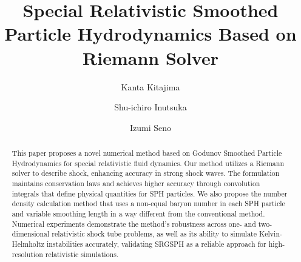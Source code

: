 \documentclass[]{aastex631}
\begin{document}
\title{Special Relativistic Smoothed Particle Hydrodynamics Based on Riemann Solver}

\author[0000-0003-0738-0707]{Kanta Kitajima}

\author[0000-0003-4366-6518]{Shu-ichiro Inutsuka}

\author[0009-0003-9296-3161]{Izumi Seno}

\begin{abstract}
This paper proposes a novel numerical method based on Godunov Smoothed Particle Hydrodynamics for special relativistic fluid dynamics. Our method utilizes a Riemann solver to describe shock, enhancing accuracy in strong shock waves.
The formulation maintains conservation laws and achieves higher accuracy through convolution integrals that define physical quantities for SPH particles.
We also propose the number density calculation method that uses a non-equal baryon number in each SPH particle and variable smoothing length in a way different from the conventional method. Numerical experiments demonstrate the method’s robustness across one- and two-dimensional relativistic shock tube problems, as well as its ability to simulate Kelvin-Helmholtz instabilities accurately, validating SRGSPH as a reliable approach for high-resolution relativistic simulations.
\end{abstract}
\end{document}
